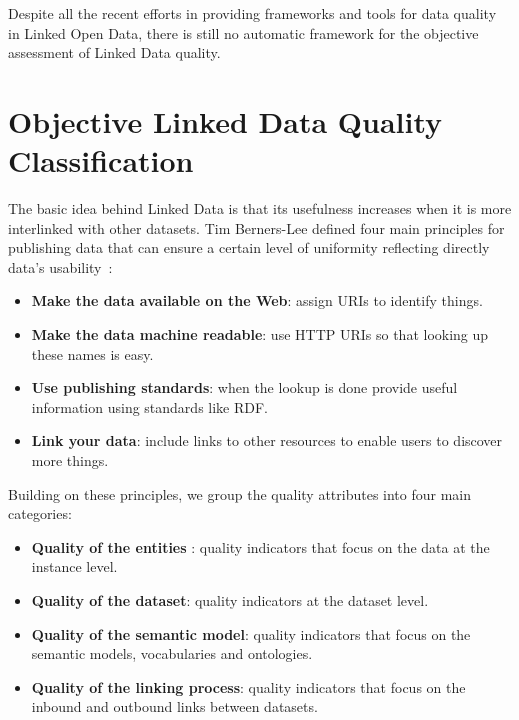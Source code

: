 Despite all the recent efforts in providing frameworks and tools for data quality in Linked Open Data, there is still no automatic framework for the objective assessment of Linked Data quality.


\section{Objective Linked Data Quality Classification}
\label{section:data-quality-classification}

The basic idea behind Linked Data is that its usefulness increases when it is more interlinked with other datasets. Tim Berners-Lee defined four main principles for publishing data that can ensure a certain level of uniformity reflecting directly data's usability~\cite{Berners-Lee:W3C:06}:

\begin{itemize}
	\item \textbf{Make the data available on the Web}: assign URIs to identify things.
	\item \textbf{Make the data machine readable}: use HTTP URIs so that looking up these names is easy.
	\item \textbf{Use publishing standards}: when the lookup is done provide useful information using standards like RDF.
	\item \textbf{Link your data}: include links to other resources to enable users to discover more things.
\end{itemize}

\noindent
Building on these principles, we group the quality attributes into four main categories:

\begin{itemize}
	\item \textbf{Quality of the entities }: quality indicators that focus on the data at the instance level.
	\item \textbf{Quality of the dataset}: quality indicators at the dataset level.
	\item \textbf{Quality of the semantic model}: quality indicators that focus on the semantic models, vocabularies and ontologies.
	\item \textbf{Quality of the linking process}: quality indicators that focus on the inbound and outbound links between datasets.
\end{itemize}

